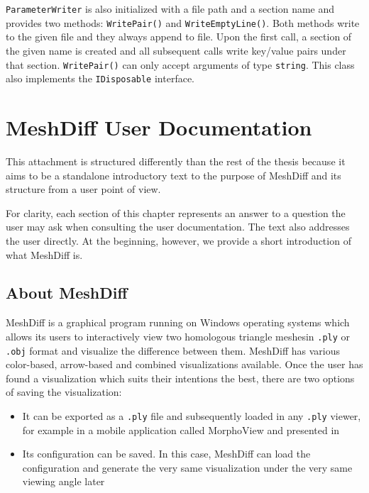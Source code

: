 \verb+ParameterWriter+ is also initialized with a file path and a section name and provides two methods: \verb+WritePair()+ and \verb+WriteEmptyLine()+. Both methods write to the given file and they always append to file. Upon the first call, a section of the given name is created and all subsequent calls write key/value pairs under that section. \verb+WritePair()+ can only accept arguments of type \verb+string+. This class also implements the \verb+IDisposable+ interface.


\section{MeshDiff User Documentation}
\label{attch:user_doc}

This attachment is structured differently than the rest of the thesis because it aims to be a standalone introductory text to the purpose of MeshDiff and its structure from a user point of view.

For clarity, each section of this chapter represents an answer to a question the user may ask when consulting the user documentation. The text also addresses the user directly. At the beginning, however, we provide a short introduction of what MeshDiff is.

\subsection{About MeshDiff}
\label{attch:user_doc-about}

MeshDiff is a graphical program running on Windows operating systems which allows its users to interactively view two homologous triangle meshes\footnotemark in \verb+.ply+ or \verb+.obj+ format and visualize the difference between them. MeshDiff has various color-based, arrow-based and combined visualizations available. Once the user has found a visualization which suits their intentions the best, there are two options of saving the visualization:

\begin{itemize}
\item It can be exported as a \verb+.ply+ file and subsequently loaded in any \verb+.ply+ viewer, for example in a mobile application called MorphoView and  presented in \citet{Pikora}
\item Its configuration can be saved. In this case, MeshDiff can load the configuration and generate the very same visualization under the very same viewing angle later
\end{itemize}

